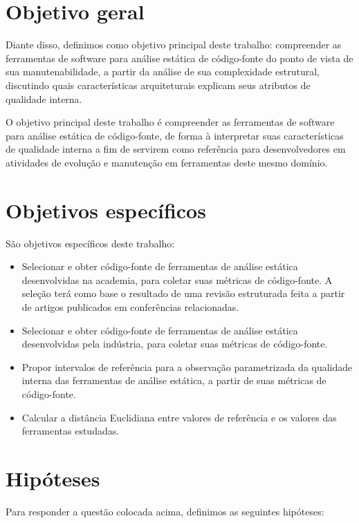 \section{Objetivo geral}

Diante disso, definimos como objetivo principal deste trabalho: compreender
as ferramentas de software para análise estática de código-fonte do ponto de
vista de sua manutenabilidade, a partir da análise de sua complexidade
estrutural, discutindo quais características arquiteturais explicam seus
atributos de qualidade interna.

O objetivo principal deste trabalho é compreender as ferramentas de software
para análise estática de código-fonte, de forma à interpretar suas
características de qualidade interna a fim de servirem como referência para
desenvolvedores em atividades de evolução e manutenção em ferramentas deste
mesmo domínio.

\section{Objetivos específicos}

São objetivos específicos deste trabalho:

\begin{itemize}
  \item Selecionar e obter código-fonte de ferramentas de análise estática
    desenvolvidas na academia, para coletar suas métricas de código-fonte.  A
    seleção terá como base o resultado de uma revisão estruturada feita a
    partir de artigos publicados em conferências relacionadas. 
  \item Selecionar e obter código-fonte de ferramentas de análise estática
    desenvolvidas pela indústria, para coletar suas métricas de código-fonte.
  \item Propor intervalos de referência para a observação parametrizada da
    qualidade interna das ferramentas de análise estática, a partir de suas
    métricas de código-fonte.
  \item Calcular a distância Euclidiana entre valores de referência e os
    valores das ferramentas estudadas.
\end{itemize}

\section{Hipóteses} \label{hipoteses}

Para responder a questão colocada acima, definimos as seguintes hipóteses:

